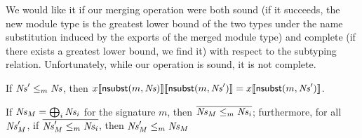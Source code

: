 We would like it if our merging operation were both sound (if it
succeeds, the new module type is the greatest lower bound of the two
types under the name substitution induced by the exports of the merged
module type) and complete (if there exists a greatest lower bound, we
find it) with respect to the subtyping relation.  Unfortunately,
while our operation is sound, it is not complete.

\begin{lemma}
\label{lem:absorb}
If $\mathit{Ns}' \le_m \mathit{Ns}$, then $x\llbracket\textsf{nsubst}(m, \mathit{Ns})\rrbracket\llbracket\textsf{nsubst}(m, \mathit{Ns}')\rrbracket = x\llbracket\textsf{nsubst}(m, \mathit{Ns}')\rrbracket$.
\end{lemma}

\begin{lemma}
\label{lem:export}
If $\mathit{Ns}_M = \bigoplus_i \mathit{Ns}_i$ for the signature $m$, then
$\overline{\mathit{Ns}_M \le_m \mathit{Ns}_i}$; furthermore,
for all $\mathit{Ns}'_M$, if
$\overline{\mathit{Ns}'_M \le_m \mathit{Ns}_i}$, then
$\mathit{Ns}'_M \le_m \mathit{Ns}_M$
\end{lemma}



